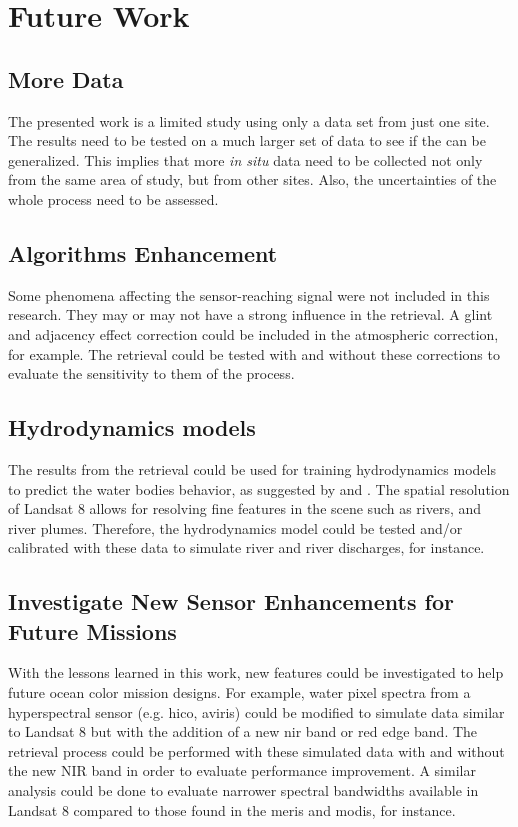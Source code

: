 \section{Future Work}
\label{sec:futurework}
\subsection{More Data} 
The presented work is a limited study using only a data set from just one site. The results need to be tested on a much larger set of data to see if the can be generalized. This implies that more {\it in situ} data need to be collected not only from the same area of study, but from other sites. Also, the uncertainties of the whole process need to be assessed.

\subsection{Algorithms Enhancement} 
Some phenomena affecting the sensor-reaching signal were not included in this research. They may or may not have a strong influence in the retrieval. A glint and adjacency effect correction could be included in the atmospheric correction, for example. The retrieval could be tested with and without these corrections to evaluate the sensitivity to them of the process.

\subsection{Hydrodynamics models} 
The results from the retrieval could be used for training hydrodynamics models to predict the water bodies behavior, as suggested by \citet{Pahlevan:2012} and \citet{GeraceThesis}. The spatial resolution of Landsat 8 allows for resolving fine features in the scene such as rivers, and river plumes. Therefore, the hydrodynamics model could be tested and/or calibrated with these data to simulate river and river discharges, for instance.

\subsection{Investigate New Sensor Enhancements for Future Missions}
With the lessons learned in this work, new features could be investigated to help future ocean color mission designs. For example, water pixel spectra from a hyperspectral sensor (e.g. \gls{hico}, \gls{aviris}) could be modified to simulate data similar to Landsat 8 but with the addition of a new \gls{nir} band or red edge band. The retrieval process could be performed with these simulated data with and without the new NIR band in order to evaluate performance improvement. A similar analysis could be done to evaluate narrower spectral bandwidths available in Landsat 8 compared to those found in the \gls{meris} and \gls{modis}, for instance. 

